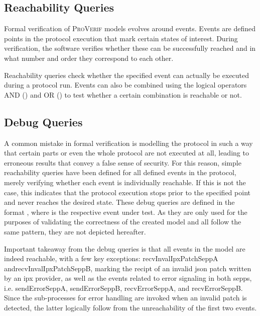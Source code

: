 \subsection{Reachability Queries}

Formal verification of \textsc{ProVerif} models evolves around events.
Events are defined points in the protocol execution that mark certain states of interest.
During verification, the software verifies whether these can be successfully reached and in what number and order they correspond to each other.

Reachability queries check whether the specified event can actually be executed during a protocol run.
Events can also be combined using the logical operators AND ({\sffamily{\&\&}}) and OR ({\sffamily{||}}) to test whether a certain combination is reachable or not.

\subsection{Debug Queries}

A common mistake in formal verification is modelling the protocol in such a way that certain parts or even the whole protocol are not executed at all, leading to erroneous results that convey a false sense of security.
For this reason, simple reachability queries have been defined for all defined events in the protocol, merely verifying whether each event is individually reachable.
If this is not the case, this indicates that the protocol execution stops prior to the specified point and never reaches the desired state.
These debug queries are defined in the format {}, where {} is the respective event under test.
As they are only used for the purposes of validating the correctness of the created model and all follow the same pattern, they are not depicted hereafter.

Important takeaway from the debug queries is that all events in the model are indeed reachable, with a few key exceptions: {\sffamily recvInvalIpxPatchSeppA} and{\sffamily recvInvalIpxPatchSeppB}, marking the recipt of an invalid \gls{json} patch written by an \gls{ipx} provider, as well as the events related to error signaling in both \glspl{sepp}, i.e. {\sffamily sendErrorSeppA}, {\sffamily sendErrorSeppB}, {\sffamily recvErrorSeppA}, and {\sffamily recvErrorSeppB}.
Since the sub-processes for error handling are invoked when an invalid patch is detected, the latter logically follow from the unreachability of the first two events.

